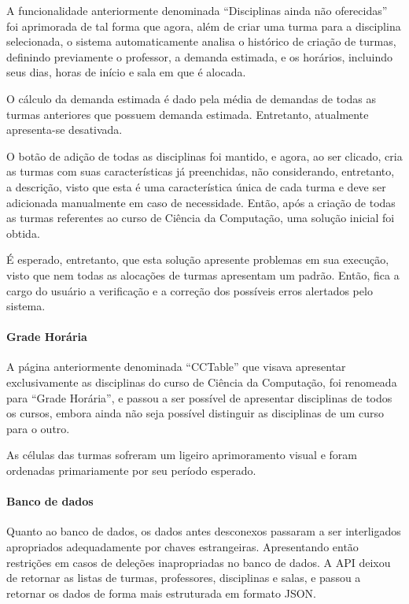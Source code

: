 A funcionalidade anteriormente denominada ``Disciplinas ainda não oferecidas'' foi aprimorada de tal forma que agora, além de criar uma turma para a disciplina selecionada, o sistema automaticamente analisa o histórico de criação de turmas, definindo previamente o professor, a demanda estimada, e os horários, incluindo seus dias, horas de início e sala em que é alocada.

O cálculo da demanda estimada é dado pela média de demandas de todas as turmas anteriores que possuem demanda estimada. Entretanto, atualmente apresenta-se desativada.


O botão de adição de todas as disciplinas foi mantido, e agora, ao ser clicado, cria as turmas com suas características já preenchidas, não considerando, entretanto, a descrição, visto que esta é uma característica única de cada turma e deve ser adicionada manualmente em caso de necessidade. Então, após a criação de todas as turmas referentes ao curso de Ciência da Computação, uma solução inicial foi obtida.

É esperado, entretanto, que esta solução apresente problemas em sua execução, visto que nem todas as alocações de turmas apresentam um padrão. Então, fica a cargo do usuário a verificação e a correção dos possíveis erros alertados pelo sistema.

\paragraph*{Grade Horária}

A página anteriormente denominada ``CCTable'' que visava apresentar exclusivamente as disciplinas do curso de Ciência da Computação, foi renomeada para ``Grade Horária'', e passou a ser possível de apresentar disciplinas de todos os cursos, embora ainda não seja possível distinguir as disciplinas de um curso para o outro.

As células das turmas sofreram um ligeiro aprimoramento visual e foram ordenadas primariamente por seu período esperado.

\paragraph*{Banco de dados}

Quanto ao banco de dados, os dados antes desconexos passaram a ser interligados apropriados adequadamente por chaves estrangeiras. Apresentando então restrições em casos de deleções inapropriadas no banco de dados. A API deixou de retornar as listas de turmas, professores, disciplinas e salas, e passou a retornar os dados de forma mais estruturada em formato JSON.

